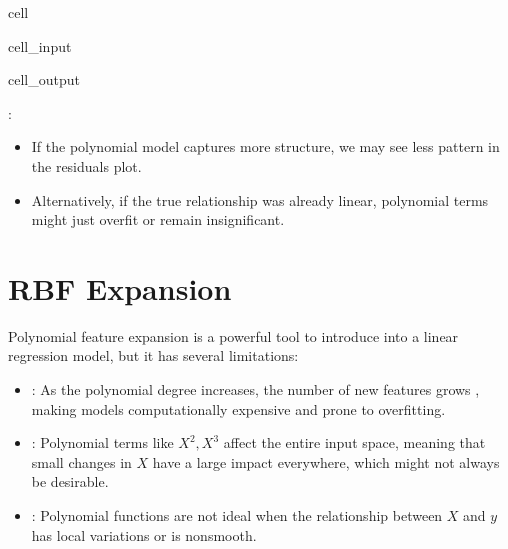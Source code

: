 \documentclass[letterpaper,10pt,english]{jupyterBook}
\begin{document}
\begin{sphinxuseclass}{cell}
\begin{sphinxVerbatimInput}
\begin{sphinxuseclass}{cell_input}
\end{sphinxuseclass}\end{sphinxVerbatimInput}
\begin{sphinxVerbatimOutput}

\begin{sphinxuseclass}{cell_output}
\noindent{}

\noindent{}

\end{sphinxuseclass}\end{sphinxVerbatimOutput}

\end{sphinxuseclass}
\sphinxAtStartPar
{}:
\begin{itemize}
\item {} 
\sphinxAtStartPar
If the polynomial model captures more structure, we may see less pattern in the residuals plot.

\item {} 
\sphinxAtStartPar
Alternatively, if the true relationship was already linear, polynomial terms might just overfit or remain insignificant.

\end{itemize}


\section{RBF Expansion}
\label{\detokenize{02:rbf-expansion}}
\sphinxAtStartPar
Polynomial feature expansion is a powerful tool to introduce  into a linear regression model, but it has several limitations:
\begin{itemize}
\item {} 
\sphinxAtStartPar
{}: As the polynomial degree increases, the number of new features grows , making models computationally expensive and prone to overfitting.

\item {} 
\sphinxAtStartPar
{}: Polynomial terms like \(X^2, X^3\) affect the entire input space, meaning that small changes in \(X\) have a large impact everywhere, which might not always be desirable.

\item {} 
\sphinxAtStartPar
{}: Polynomial functions are not ideal when the relationship between \(X\) and \(y\) has local variations or is non\sphinxhyphen{}smooth.

\end{itemize}
\end{document}
